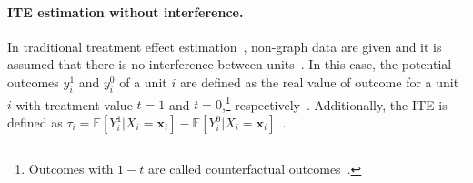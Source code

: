 \documentclass[runningheads]{llncs}
\begin{document}
\paragraph{ITE estimation without interference.} In traditional treatment effect estimation~\cite{rubin1980randomization,yao2021survey}, non-graph data are given and it is assumed that there is no interference between units~\cite{rubin1980randomization,yao2021survey}. In this case, the potential outcomes $y_{i}^{1}$ and $y_{i}^{0}$ of a unit $i$ are defined as the real value of outcome for a unit $i$ with treatment value 
 $t=1$ and $t=0$,\footnote{Outcomes with $1-t$ are called counterfactual outcomes~\cite{yao2021survey}.} respectively~\cite{yao2021survey}. Additionally, the ITE is defined as $\tau_i = \mathbb{E}[Y_i^{1}\vert X_i=\boldsymbol{x}_i]-\mathbb{E}[Y_i^{0}\vert X_i=\boldsymbol{x}_i]$~\cite{yao2021survey}.



\end{document}
